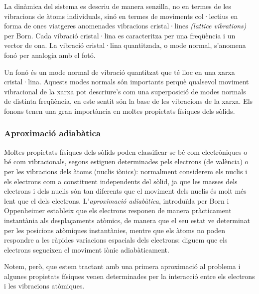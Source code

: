 \documentclass[12pt]{article} %
\begin{document}
La dinàmica del sistema es descriu de manera senzilla, no en termes de les vibracions de àtoms individuals, sinó en termes de moviments col·lectius en forma de ones viatgeres anomenades vibracions cristal·lines \emph{(\foreignlanguage{english}{lattice vibrations})} per Born. Cada vibració cristal·lina es caracteritza per una freqüència i un vector de ona.
La vibració cristal·lina quantitzada, o mode normal, s'anomena fonó per analogia amb el fotó. %

Un fonó és un mode normal de vibració quantitzat que té lloc en una xarxa cristal·lina.  Aquests modes normals són importants perquè qualsevol moviment vibracional de la xarxa pot descriure's com una superposició de modes normals de distinta freqüència, en este sentit són la base de les vibracions de la xarxa. Els fonons tenen una gran importància en moltes propietats físiques dels sòlids. 


\subsubsection{Aproximació adiabàtica}

Moltes propietats físiques dels sòlids poden classificar-se bé com electròniques o bé com vibracionals, segons estiguen determinades pels electrons (de valència) o per les vibracions dels àtoms (nuclis iònics): normalment considerem els nuclis i els electrons com a constituent independents del sòlid, ja que les masses dels electrons i dels nuclis són tan diferents que el moviment dels nuclis és molt més lent que el dels electrons. L'\emph{aproximació adiabàtica}, introduïda per Born i Oppenheimer \cite{ANDP:ANDP19273892002} estableix que els electrons responen de manera pràcticament instantània als desplaçaments atòmics, de manera que el seu estat ve determinat per les posicions atòmiques instantànies, mentre que els àtoms no poden respondre a les ràpides variacions espacials dels electrons: diguem que els electrons segueixen el moviment iònic adiabàticament.

Notem, però, que estem tractant amb una primera aproximació al problema i algunes propietats físiques venen determinades per la interacció entre els electrons i les vibracions atòmiques.
\end{document}
